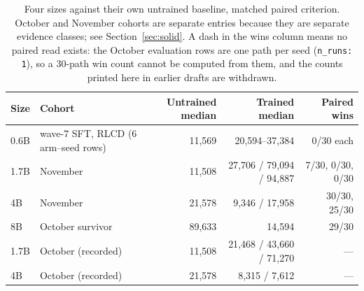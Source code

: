 \documentclass[11pt]{article}
\begin{document}
\begin{table}[ht]
\centering
\caption{Four sizes against their own untrained baseline, matched paired criterion. October and
November cohorts are separate entries because they are separate evidence classes; see
Section~\ref{sec:solid}. A dash in the wins column means no paired read exists: the October evaluation
rows are one path per seed (\texttt{n\_runs: 1}), so a 30-path win count cannot be computed from them,
and the counts printed here in earlier drafts are withdrawn.}
\label{tab:rungs}
\small
\begin{tabular}{@{}llrrr@{}}
\toprule
Size & Cohort & Untrained median & Trained median & Paired wins \\
\midrule
0.6B & wave-7 SFT, RLCD (6 arm--seed rows) & 11{,}569 & 20{,}594--37{,}384 & 0/30 each \\
1.7B & November & 11{,}508 & 27{,}706 / 79{,}094 / 94{,}887 & 7/30, 0/30, 0/30 \\
4B & November & 21{,}578 & 9{,}346 / 17{,}958 & 30/30, 25/30 \\
8B & October survivor & 89{,}633 & 14{,}594 & 29/30 \\
\midrule
1.7B & October (recorded) & 11{,}508 & 21{,}468 / 43{,}660 / 71{,}270 & ---\footnotemark[1] \\
4B & October (recorded) & 21{,}578 & 8{,}315 / 7{,}612 & ---\footnotemark[1] \\
\bottomrule
\end{tabular}
\end{table}
\end{document}
